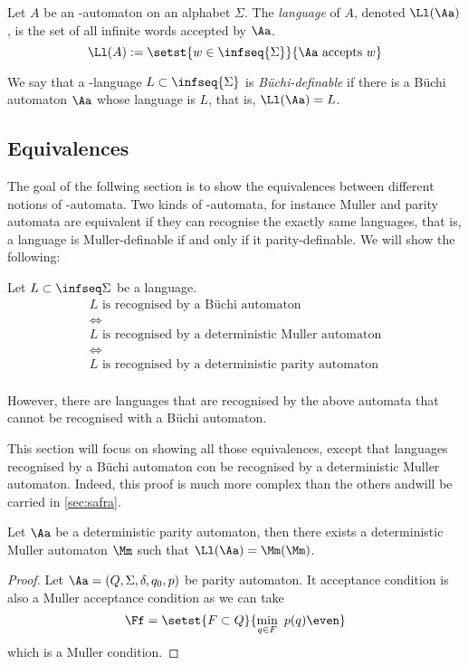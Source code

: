 
\begin{definition}
    Let $A$ be an \w-automaton on an alphabet $\Sigma$.
    The \emph{language} of $A$, denoted $\Ll(\Aa)$,
    is the set of all infinite words accepted by $\Aa$.
    \[
        \Ll(A) := \setst{w \in \infseq{\Sigma}}{\Aa \text{ accepts } w}
    \]

    We say that a \w-language $L \subset \infseq{\Sigma}$ is
    \emph{Büchi-definable} if there is a Büchi automaton $\Aa$
    whose language is $L$,  that is, $\Ll(\Aa) = L$.
\end{definition}

\subsection{Equivalences}
The goal of the follwing section is to show the equivalences
between different notions of \w-automata.
Two kinds of \w-automata, for instance Muller and parity automata
are equivalent if they can recognise the exactly same languages,
that is, a language is Muller-definable if and only if it parity-definable.
We will show the following:

\begin{theorem}
    \label{thm:all-automata-are-the-same}
    Let $L \subset \infseq\Sigma$ be a language.
    \[
        \begin{array}{c}
        L \text{ is recognised by a Büchi automaton} \\
        \iff \\
        L \text{ is recognised by a deterministic Muller automaton} \\
        \iff \\
        L \text{ is recognised by a deterministic parity automaton} \\
        \end{array}
    \]

    However, there are languages that are recognised by the above
    automata that cannot be recognised with a Büchi automaton.
\end{theorem}

This section will focus on showing all those equivalences,
except that languages recognised by a Büchi automaton
con be recognised by a deterministic Muller automaton.
Indeed, this proof is much more complex than the others
andwill be carried in \autoref{sec:safra}.


\begin{lemma}
    Let $\Aa$ be a deterministic parity automaton,
    then there exists a deterministic Muller automaton $\Mm$
    such that $\Ll(\Aa) = \Mm(\Mm)$.
\end{lemma}
\begin{proof}
    Let $\Aa = (Q, \Sigma, \delta, q_0, p)$ be parity automaton.
    It acceptance condition is also a Muller acceptance condition as we can take
    \[
        \Ff = \setst{F \subset Q}{\min_{q \in F} ~p(q) \even}
    \]
    which is a Muller condition.
\end{proof}

